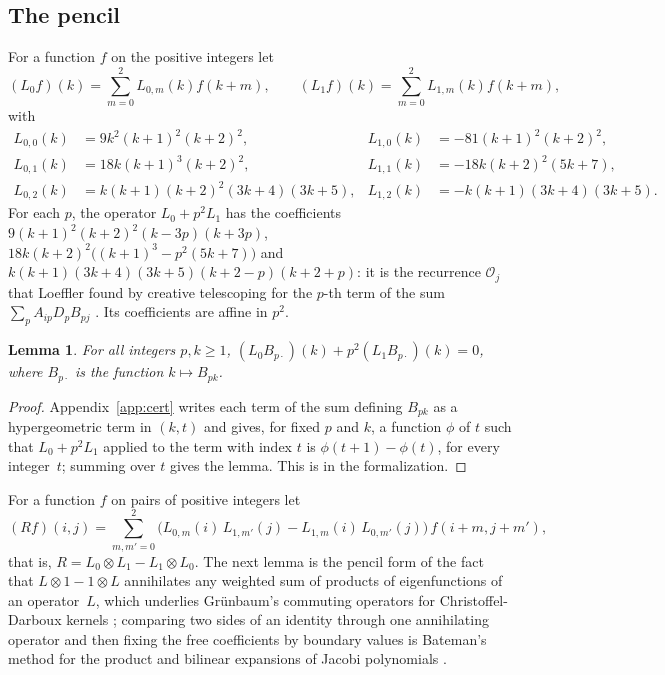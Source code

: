 \documentclass[11pt]{amsart}
\newtheorem{lemma}[theorem]{Lemma}
\theoremstyle{definition}
\numberwithin{equation}{section}
\newcommand{\lean}[1]{\ignorespaces}
\begin{document}
\subsection{The pencil}
For a function $f$ on the positive integers let
\[
(L_0f)(k)=\sum_{m=0}^2L_{0,m}(k)f(k+m),\qquad (L_1f)(k)=\sum_{m=0}^2L_{1,m}(k)f(k+m),
\]
with
\begin{align*}
L_{0,0}(k)&=9k^2(k+1)^2(k+2)^2, & L_{1,0}(k)&=-81(k+1)^2(k+2)^2,\\
L_{0,1}(k)&=18k(k+1)^3(k+2)^2, & L_{1,1}(k)&=-18k(k+2)^2(5k+7),\\
L_{0,2}(k)&=k(k+1)(k+2)^2(3k+4)(3k+5), & L_{1,2}(k)&=-k(k+1)(3k+4)(3k+5).
\end{align*}
For each $p$, the operator $L_0+p^2L_1$ has the coefficients $9(k+1)^2(k+2)^2(k-3p)(k+3p)$, $18k(k+2)^2\bigl((k+1)^3-p^2(5k+7)\bigr)$ and $k(k+1)(3k+4)(3k+5)(k+2-p)(k+2+p)$: it is the recurrence $\mathcal O_j$ that Loeffler found by creative telescoping for the $p$-th term of the sum $\sum_pA_{ip}D_pB_{pj}$ \cite[\S4]{Loe08}. Its coefficients are affine in $p^2$.

\begin{lemma}\label{lem:P1}\lean{CalegariSlopes.ADB.P1}
For all integers $p,k\ge1$, $(L_0B_{p\cdot})(k)+p^2(L_1B_{p\cdot})(k)=0$, where $B_{p\cdot}$ is the function $k\mapsto B_{pk}$.
\end{lemma}

\begin{proof}
Appendix~\ref{app:cert} writes each term of the sum defining $B_{pk}$ as a hypergeometric term in $(k,t)$ and gives, for fixed $p$ and $k$, a function $\phi$ of $t$ such that $L_0+p^2L_1$ applied to the term with index $t$ is $\phi(t+1)-\phi(t)$, for every integer~$t$; summing over $t$ gives the lemma. This is  in the formalization.
\end{proof}

For a function $f$ on pairs of positive integers let
\[
(Rf)(i,j)=\sum_{m,m'=0}^2\bigl(L_{0,m}(i)\,L_{1,m'}(j)-L_{1,m}(i)\,L_{0,m'}(j)\bigr)\,f(i+m,j+m'),
\]
that is, $R=L_0\otimes L_1-L_1\otimes L_0$. The next lemma is the pencil form of the fact that $L\otimes1-1\otimes L$ annihilates any weighted sum of products of eigenfunctions of an operator~$L$, which underlies Gr\"unbaum's commuting operators for Christoffel-Darboux kernels \cite[p.~493]{Gru83}; comparing two sides of an identity through one annihilating operator and then fixing the free coefficients by boundary values is Bateman's method for the product and bilinear expansions of Jacobi polynomials \cite[\S2]{Koo74}.
\end{document}
